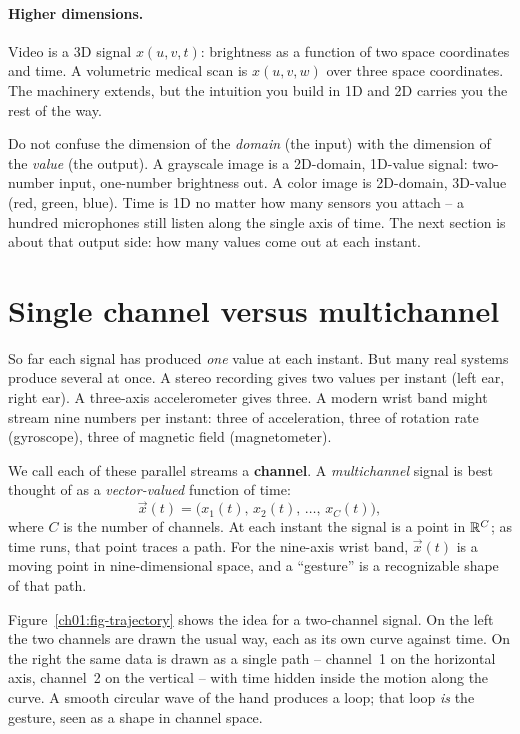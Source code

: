 \paragraph{Higher dimensions.} Video is a 3D signal $x(u,v,t)$: brightness as a function of two
space coordinates and time. A volumetric medical scan is $x(u,v,w)$ over three space
coordinates. The machinery extends, but the intuition you build in 1D and 2D carries you the
rest of the way.

\begin{focusbox}
Do not confuse the dimension of the \emph{domain} (the input) with the dimension of the
\emph{value} (the output). A grayscale image is a 2D-domain, 1D-value signal: two-number input,
one-number brightness out. A color image is 2D-domain, 3D-value (red, green, blue). Time is 1D
no matter how many sensors you attach -- a hundred microphones still listen along the single
axis of time. The next section is about that output side: how many values come out at each
instant.
\end{focusbox}

\section{Single channel versus multichannel}
\label{ch01:channels}

So far each signal has produced \emph{one} value at each instant. But many real systems produce
several at once. A stereo recording gives two values per instant (left ear, right ear). A
three-axis accelerometer gives three. A modern wrist band might stream nine numbers per instant:
three of acceleration, three of rotation rate (gyroscope), three of magnetic field
(magnetometer).

We call each of these parallel streams a \textbf{channel}. A \emph{multichannel} signal is best
thought of as a \emph{vector-valued} function of time:
\[
  \vec{x}(t) = \big(x_1(t),\, x_2(t),\, \dots,\, x_C(t)\big),
\]
where $C$ is the number of channels. At each instant the signal is a point in $\mathbb{R}^C$; as time
runs, that point traces a path. For the nine-axis wrist band, $\vec{x}(t)$ is a moving point in
nine-dimensional space, and a ``gesture'' is a recognizable shape of that path.

Figure~\ref{ch01:fig-trajectory} shows the idea for a two-channel signal. On the left the two
channels are drawn the usual way, each as its own curve against time. On the right the same data
is drawn as a single path -- channel~1 on the horizontal axis, channel~2 on the vertical -- with
time hidden inside the motion along the curve. A smooth circular wave of the hand produces a
loop; that loop \emph{is} the gesture, seen as a shape in channel space.

